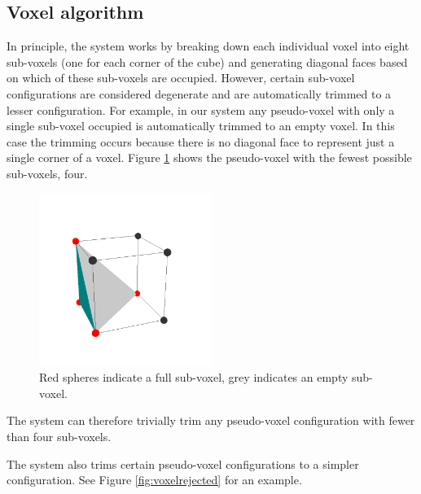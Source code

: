 \subsection{Voxel algorithm}

In principle, the system works by breaking down each individual voxel into eight sub-voxels (one for each corner of the cube) and generating diagonal faces based on which of these sub-voxels are occupied.
However, certain sub-voxel configurations are considered degenerate and are automatically trimmed to a lesser configuration.
For example, in our system any pseudo-voxel with only a single sub-voxel occupied is automatically trimmed to an empty voxel.
In this case the trimming occurs because there is no diagonal face to represent just a single corner of a voxel.
Figure \ref{fig:minimumvoxel} shows the pseudo-voxel with the fewest possible sub-voxels, four.

\begin{figure}
	\centering
		\includegraphics[width=0.5\textwidth]{figures/minimumvoxel_edges.png}
	\caption{Red spheres indicate a full sub-voxel, grey indicates an empty sub-voxel.}
	\label{fig:minimumvoxel}
\end{figure}

The system can therefore trivially trim any pseudo-voxel configuration with fewer than four sub-voxels.

The system also trims certain pseudo-voxel configurations to a simpler configuration.
See Figure \ref{fig:voxelrejected} for an example.

